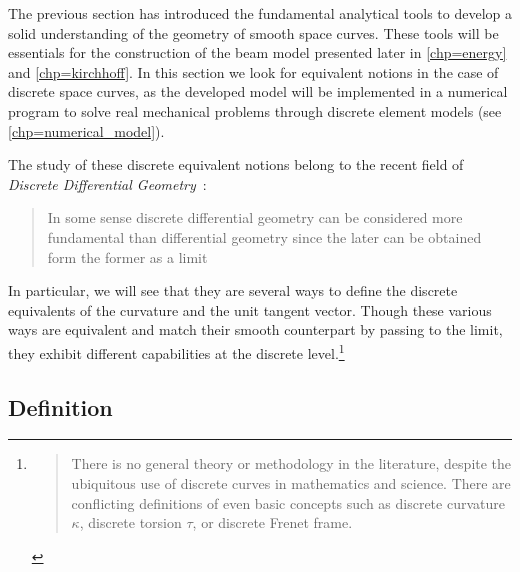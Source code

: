 
The previous section has introduced the fundamental analytical tools to develop a solid understanding of the geometry of smooth space curves. These tools will be essentials for the construction of the beam model presented later in \cref{chp=energy} and \cref{chp=kirchhoff}. In this section we look for equivalent notions in the case of discrete space curves, as the developed model will be implemented in a numerical program to solve real mechanical problems through discrete element models (see \cref{chp=numerical_model}).

The study of these discrete equivalent notions belong to the recent field of \emph{Discrete Differential Geometry}~: \blockcquote[p.7]{Hoffmann2008}{In some sense discrete differential geometry can be considered more fundamental than differential geometry since the later can be obtained form the former as a limit}. In particular, we will see that they are several ways to define the discrete equivalents of the curvature and the unit tangent vector. Though these various ways are equivalent and match their smooth counterpart by passing to the limit, they exhibit different capabilities at the discrete level.\footnote{\blockcquote[p.1]{Carroll2014}{There is no general theory or methodology in the literature, despite the ubiquitous use of discrete curves in mathematics and science. There are conflicting definitions of even basic concepts such as discrete curvature $\kappa$, discrete torsion $\tau$, or discrete Frenet frame.}}


\subsection{Definition}

